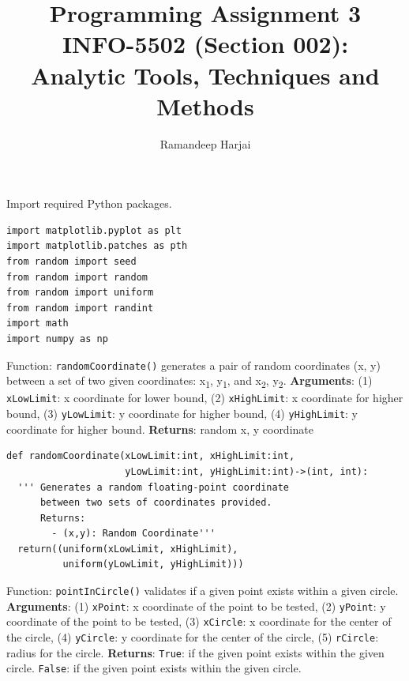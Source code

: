 \documentclass[UTF8, letter]{article}
\title{Programming Assignment 3 \\
\large INFO-5502 (Section 002): \\
Analytic Tools, Techniques and Methods }
\author{Ramandeep Harjai}
\begin{document}
\maketitle

\doublespacing
\setlength{\parskip}{\baselineskip}
\setlength{\parindent}{4em}

\begin{flushleft}
\noindent
Import required Python packages.
\end{flushleft}

\begin{codeblock}
\begin{verbatim}
import matplotlib.pyplot as plt
import matplotlib.patches as pth
from random import seed
from random import random
from random import uniform
from random import randint
import math
import numpy as np
\end{verbatim}
\end{codeblock}


\begin{flushleft} \noindent
Function: \texttt{randomCoordinate()} generates a pair of random coordinates (x, y) between a set of two given coordinates: x\textsubscript{1}, y\textsubscript{1}, and x\textsubscript{2}, y\textsubscript{2}.
\linebreak
\textbf{Arguments}: (1) \texttt{xLowLimit}: x coordinate for lower bound, (2) \texttt{xHighLimit}: x coordinate for higher bound, (3) \texttt{yLowLimit}: y coordinate for higher bound, (4) \texttt{yHighLimit}: y coordinate for higher bound. 
\linebreak
\textbf{Returns}: random x, y coordinate
\end{flushleft}

\begin{codeblock}
\begin{verbatim}
def randomCoordinate(xLowLimit:int, xHighLimit:int, 
                     yLowLimit:int, yHighLimit:int)->(int, int):
  ''' Generates a random floating-point coordinate 
      between two sets of coordinates provided. 
      Returns:
        - (x,y): Random Coordinate'''
  return((uniform(xLowLimit, xHighLimit),
          uniform(yLowLimit, yHighLimit)))
\end{verbatim}
\end{codeblock}

\pagebreak

\begin{flushleft} 
\noindent
Function: \texttt{pointInCircle()} validates if a given point exists within a given circle.
\linebreak
\textbf{Arguments}: (1) \texttt{xPoint}: x coordinate of the point to be tested, (2) \texttt{yPoint}: y coordinate of the point to be tested, (3) \texttt{xCircle}: x coordinate for the center of the circle, (4) \texttt{yCircle}: y coordinate for the center of the circle, (5) \texttt{rCircle}: radius for the circle.
\linebreak
\textbf{Returns}: \texttt{True}: if the given point exists within the given circle. \texttt{False}: if the given point exists within the given circle. 
\end{flushleft}
\end{document}
